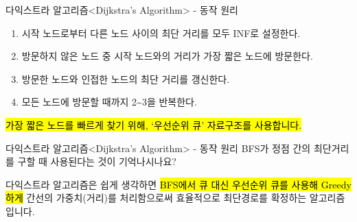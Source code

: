 
\begin{frame}{다익스트라 알고리즘}{<Dijkstra's Algorithm> - 동작 원리}
  \vspace{8mm}
  \begin{enumerate}
    \item 시작 노드로부터 다른 노드 사이의 최단 거리를 모두 INF로 설정한다.
    \item 방문하지 않은 노드 중 시작 노드와의 거리가 가장 짧은 노드에 방문한다.
    \item 방문한 노드와 인접한 노드의 최단 거리를 갱신한다.
    \item 모든 노드에 방문할 때까지 2\textasciitilde3을 반복한다.
  \end{enumerate}
  \vspace{4mm}
  \hl{가장 짧은 노드를 빠르게 찾기 위해, `우선순위 큐' 자료구조를 사용합니다.}
\end{frame}

\begin{frame}{다익스트라 알고리즘}{<Dijkstra's Algorithm> - 동작 원리}
  \vspace{10mm}
  BFS가 정점 간의 최단거리를 구할 때 사용된다는 것이 기억나시나요?\par\vspace{3mm}
  다익스트라 알고리즘은 쉽게 생각하면 \hl{BFS에서 큐 대신 우선순위 큐를 사용해 Greedy하게}
  간선의 가중치(거리)를 처리함으로써 효율적으로 최단경로를 확정하는 알고리즘입니다.
\end{frame}


